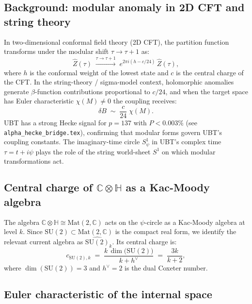 \documentclass[11pt,a4paper]{article}
\theoremstyle{definition}
\theoremstyle{remark}
\begin{document}
\subsection{Background: modular anomaly in 2D CFT and string theory}

In two-dimensional conformal field theory (2D CFT), the partition function
transforms under the modular shift $\tau \to \tau + 1$ as:
\begin{equation}
  \hat{Z}(\tau)
  \;\xrightarrow{\tau\to\tau+1}\;
  e^{2\pi i(h - c/24)}\,\hat{Z}(\tau),
  \label{eq:modular_shift}
\end{equation}
where $h$ is the conformal weight of the lowest state and $c$ is the central
charge of the CFT.
In the string-theory / sigma-model context, holomorphic anomalies generate
$\beta$-function contributions proportional to $c/24$, and when the target
space has Euler characteristic $\chi(M) \neq 0$ the coupling receives:
\begin{equation}
  \delta B \;\sim\; \frac{c}{24}\;\chi(M).
  \label{eq:B_holom_anomaly}
\end{equation}
UBT has a strong Hecke signal for $p = 137$ with $P < 0.003\%$
(see \texttt{alpha\_hecke\_bridge.tex}), confirming that modular forms
govern UBT's coupling constants.
The imaginary-time circle $S^1_\psi$ in UBT's complex time $\tau = t + i\psi$
plays the role of the string world-sheet $S^1$ on which modular transformations
act.

\subsection{Central charge of $\mathbb{C}\otimes\mathbb{H}$ as a Kac-Moody algebra}

The algebra $\mathbb{C}\otimes\mathbb{H} \cong \mathrm{Mat}(2,\mathbb{C})$
acts on the $\psi$-circle as a Kac-Moody algebra at level $k$.
Since $\mathrm{SU}(2) \subset \mathrm{Mat}(2,\mathbb{C})$ is the compact real form,
we identify the relevant current algebra as $\widehat{\mathrm{SU}(2)}_k$.
Its central charge is:
\begin{equation}
  c_{\mathrm{SU}(2),k}
  \;=\; \frac{k\,\dim\bigl(\mathrm{SU}(2)\bigr)}{k + h^\vee}
  \;=\; \frac{3k}{k+2},
  \label{eq:central_charge_su2}
\end{equation}
where $\dim(\mathrm{SU}(2)) = 3$ and $h^\vee = 2$ is the dual Coxeter number.

\subsection{Euler characteristic of the internal space}
\end{document}
